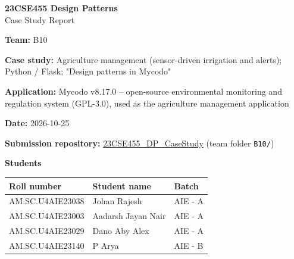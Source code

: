 \documentclass[11pt,a4paper]{article}
\newcommand{\field}[2]{\textbf{#1:} #2\par}
\begin{document}
\begin{center}\Large\textbf{23CSE455 Design Patterns}\\[4pt]\LARGE Case Study Report\end{center}

\field{Team}{B10}
\field{Case study}{Agriculture management (sensor-driven irrigation and alerts); Python / Flask; "Design patterns in Mycodo"}
\field{Application}{Mycodo v8.17.0 -- open-source environmental monitoring and regulation system (GPL-3.0), used as the agriculture management application}
\field{Date}{2026-10-25}
\textbf{Submission repository:} \href{https://github.com/aswathymohan-amrita/23CSE455_DP_CaseStudy}{23CSE455\_DP\_CaseStudy} (team folder \texttt{B10/})\par
\textbf{Students}\par
\begin{tabularx}{\linewidth}{@{}llX@{}}\toprule
Roll number & Student name & Batch\\\midrule
AM.SC.U4AIE23038 & Johan Rajesh & AIE - A\\
AM.SC.U4AIE23003 & Aadarsh Jayan Nair & AIE - A\\
AM.SC.U4AIE23029 & Dano Aby Alex & AIE - A\\
AM.SC.U4AIE23140 & P Arya & AIE - B\\\bottomrule
\end{tabularx}
\end{document}
